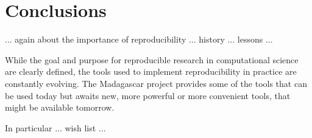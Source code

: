 \section{Conclusions}

... again about the importance of reproducibility ... history
... lessons ...

While the goal and purpose for reproducible research in computational
science are clearly defined, the tools used to implement
reproducibility in practice are constantly evolving. The Madagascar
project provides some of the tools that can be used today but awaits
new, more powerful or more convenient tools, that might be available
tomorrow.

In particular ... wish list ...



